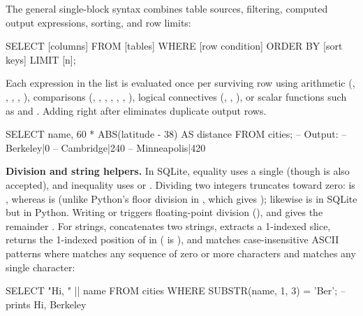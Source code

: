 \documentclass[10pt]{scrartcl}
\begin{document}
The general single-block  syntax combines table sources, filtering, computed output expressions, sorting, and row limits:
\begin{sql}
SELECT [columns]
FROM   [tables]
WHERE  [row condition]
ORDER BY [sort keys]
LIMIT  [n];
\end{sql}
Each expression in the  list is evaluated once per surviving row using arithmetic (\cd{+}, \cd{-}, \cd{*}, \cd{/}, \cd{\%}), comparisons (\cd{=}, \cd{<>}, \cd{!=}, \cd{<}, \cd{<=}, \cd{>}, \cd{>=}), logical connectives (, , ), or scalar functions such as  and . Adding  right after  eliminates duplicate output rows.

\begin{sql}
SELECT name, 60 * ABS(latitude - 38) AS distance FROM cities;
-- Output:
-- Berkeley|0
-- Cambridge|240
-- Minneapolis|420
\end{sql}

\medskip\noindent\textbf{Division and string helpers.} In SQLite, equality uses a single \cd{=} (though \cd{==} is also accepted), and inequality uses \cd{!=} or \cd{<>}. Dividing two integers truncates toward zero:  is , whereas  is  (unlike Python's floor division in , which gives ); likewise  is  in SQLite but  in Python. Writing  or  triggers floating-point division (), and  gives the remainder . For strings, \cd{||} concatenates two strings,  extracts a 1-indexed slice,  returns the 1-indexed position of  in  ( is ), and  matches case-insensitive ASCII patterns where \cd{\%} matches any sequence of zero or more characters and \cd{\_} matches any single character:
\begin{sql}
SELECT "Hi, " || name FROM cities WHERE SUBSTR(name, 1, 3) = 'Ber';  -- prints Hi, Berkeley
\end{sql}
\end{document}
